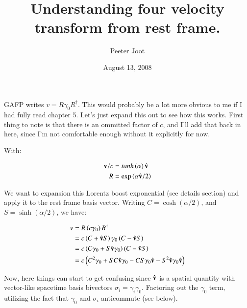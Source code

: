 \documentclass{article}      %
\title{Understanding four velocity transform from rest frame.}
\author{Peeter Joot}
\date{August 13, 2008}
\begin{document}

\maketitle{}

\section{}

GAFP writes $v = R \gamma_0 R^\dagger$.  This would probably be a lot more
obvious to me if I had fully read chapter 5.  Let's just expand this out
to see how this works.  First thing to note is that there is an ommitted factor
of $c$, and I'll add that back in here, since I'm not comfortable enough
without it explicitly for now.

With:

\begin{align*}
\mathbf{v}/c &= tanh\left(\alpha\right)\hat{\mathbf{v}} \\
R &= \exp\left(\alpha \hat{\mathbf{v}}/2\right)
\end{align*}

We want to expansion this Lorentz boost exponential (see details section) and apply it to the rest frame basis vector.  Writing
$C = \cosh\left(\alpha/2\right)$, and $S = \sinh\left(\alpha/2\right)$, we have:

\begin{align*}
v
&= R \left(c \gamma_0\right) R^\dagger \\
&= c \left(C + \hat{\mathbf{v}} S\right) \gamma_0 \left(C - \hat{\mathbf{v}} S\right) \\
&= c \left(C \gamma_0 + S \hat{\mathbf{v}} \gamma_0\right) \left(C - \hat{\mathbf{v}} S\right) \\
&= c \left( C^2 \gamma_0 + SC \hat{\mathbf{v}} \gamma_0 -CS \gamma_0\hat{\mathbf{v}} - S^2 \hat{\mathbf{v}} \gamma_0 \hat{\mathbf{v}} \right) \\
\end{align*}

Now, here things can start to get confusing since $\hat{\mathbf{v}}$ is a spatial quantity with vector-like spacetime basis bivectors $\sigma_i = \gamma_i \gamma_0$.  Factoring out the $\gamma_0$ term, utilizing the fact that $\gamma_0$ and $\sigma_i$ anticommute (see below).
\end{document}
